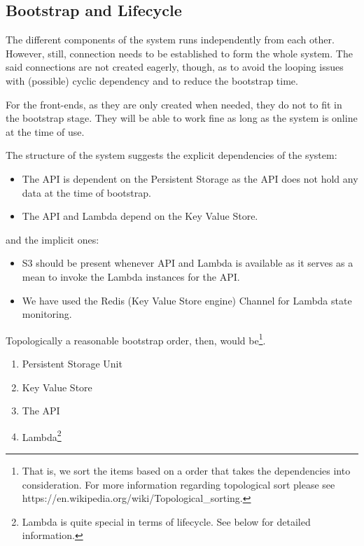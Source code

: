 
\subsection{Bootstrap and Lifecycle}

The different components of the system runs independently from each other. However, still, connection needs to be established to form the whole system. The said connections are not created eagerly, though, as to avoid the looping issues with (possible) cyclic dependency and to reduce the bootstrap time.

For the front-ends, as they are only created when needed, they do not to fit in the bootstrap stage. They will be able to work fine as long as the system is online at the time of use.

The structure of the system suggests the explicit dependencies of the system:

\begin{itemize}
	\item The API is dependent on the Persistent Storage as the API does not hold any data at the time of bootstrap.
	\item The API and Lambda depend on the Key Value Store.
\end{itemize}

and the implicit ones:

\begin{itemize}
	\item S3 should be present whenever API and Lambda is available as it serves as a mean to invoke the Lambda instances for the API.
	\item We have used the Redis (Key Value Store engine) Channel for Lambda state monitoring.
\end{itemize}

Topologically a reasonable bootstrap order, then, would be\footnote{That is, we sort the items based on a order that takes the dependencies into consideration. For more information regarding topological sort please see https://en.wikipedia.org/wiki/Topological\_sorting.}.

\begin{enumerate}
	\item[1] Persistent Storage Unit
	\item[1] Key Value Store
	\item[2] The API
	\item[3] Lambda\footnote{Lambda is quite special in terms of lifecycle. See below for detailed information.}
\end{enumerate}

